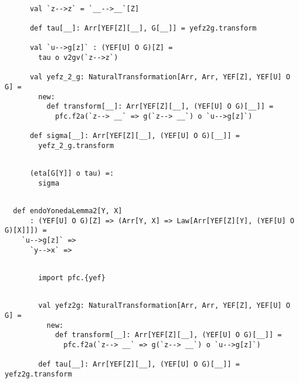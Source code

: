 \documentclass[11pt]{article}
\begin{document}
\vspace{6pt}
\begin{mdframed}[backgroundcolor=lightgray!20] 
\begin{lstlisting}

      val `z-->z` = `__-->__`[Z]

      def tau[__]: Arr[YEF[Z][__], G[__]] = yefz2g.transform

      val `u-->g[z]` : (YEF[U] O G)[Z] =
        tau o v2gv(`z-->z`)

      val yefz_2_g: NaturalTransformation[Arr, Arr, YEF[Z], YEF[U] O G] =
        new:
          def transform[__]: Arr[YEF[Z][__], (YEF[U] O G)[__]] =
            pfc.f2a(`z--> __` => g(`z--> __`) o `u-->g[z]`)

      def sigma[__]: Arr[YEF[Z][__], (YEF[U] O G)[__]] =
        yefz_2_g.transform
\end{lstlisting}
\end{mdframed}
\vspace{6pt}
\begin{mdframed}[backgroundcolor=lightgray!20] 
\begin{lstlisting}

      (eta[G[Y]] o tau) =:
        sigma
\end{lstlisting}
\end{mdframed}
\vspace{6pt}
\begin{mdframed}[backgroundcolor=lightgray!20] 
\begin{lstlisting}

  def endoYonedaLemma2[Y, X]
      : (YEF[U] O G)[Z] => (Arr[Y, X] => Law[Arr[YEF[Z][Y], (YEF[U] O G)[X]]]) =
    `u-->g[z]` =>
      `y-->x` =>
\end{lstlisting}
\end{mdframed}
\vspace{6pt}
\begin{mdframed}[backgroundcolor=lightgray!20] 
\begin{lstlisting}

        import pfc.{yef}
\end{lstlisting}
\end{mdframed}
\vspace{6pt}
\begin{mdframed}[backgroundcolor=lightgray!20] 
\begin{lstlisting}

        val yefz2g: NaturalTransformation[Arr, Arr, YEF[Z], YEF[U] O G] =
          new:
            def transform[__]: Arr[YEF[Z][__], (YEF[U] O G)[__]] =
              pfc.f2a(`z--> __` => g(`z--> __`) o `u-->g[z]`)

        def tau[__]: Arr[YEF[Z][__], (YEF[U] O G)[__]] = yefz2g.transform
\end{lstlisting}
\end{mdframed}
\end{document}
